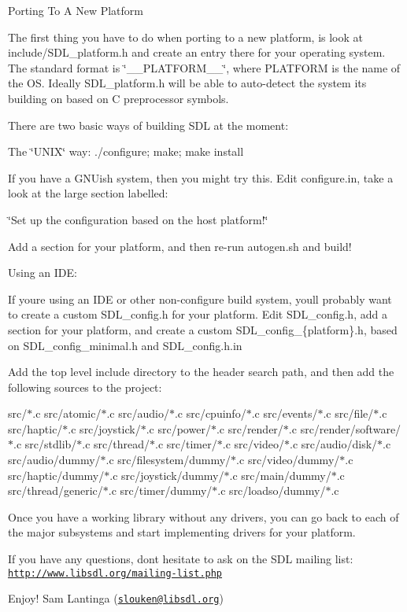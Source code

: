 
\begin{DoxyItemize}
\item Porting To A New Platform

The first thing you have to do when porting to a new platform, is look at include/\+S\+D\+L\+\_\+platform.\+h and create an entry there for your operating system. The standard format is \char`\"{}\+\_\+\+\_\+\+P\+L\+A\+T\+F\+O\+R\+M\+\_\+\+\_\+\char`\"{}, where P\+L\+A\+T\+F\+O\+RM is the name of the OS. Ideally S\+D\+L\+\_\+platform.\+h will be able to auto-\/detect the system it\textquotesingle{}s building on based on C preprocessor symbols.
\end{DoxyItemize}

There are two basic ways of building S\+DL at the moment\+:


\begin{DoxyEnumerate}
\item The \char`\"{}\+U\+N\+I\+X\char`\"{} way\+: ./configure; make; make install

If you have a G\+N\+Uish system, then you might try this. Edit configure.\+in, take a look at the large section labelled\+:

\char`\"{}\+Set up the configuration based on the host platform!\char`\"{}

Add a section for your platform, and then re-\/run autogen.\+sh and build!
\item Using an I\+DE\+:

If you\textquotesingle{}re using an I\+DE or other non-\/configure build system, you\textquotesingle{}ll probably want to create a custom S\+D\+L\+\_\+config.\+h for your platform. Edit S\+D\+L\+\_\+config.\+h, add a section for your platform, and create a custom S\+D\+L\+\_\+config\+\_\+\{platform\}.h, based on S\+D\+L\+\_\+config\+\_\+minimal.\+h and S\+D\+L\+\_\+config.\+h.\+in

Add the top level include directory to the header search path, and then add the following sources to the project\+:

src/$\ast$.c src/atomic/$\ast$.c src/audio/$\ast$.c src/cpuinfo/$\ast$.c src/events/$\ast$.c src/file/$\ast$.c src/haptic/$\ast$.c src/joystick/$\ast$.c src/power/$\ast$.c src/render/$\ast$.c src/render/software/$\ast$.c src/stdlib/$\ast$.c src/thread/$\ast$.c src/timer/$\ast$.c src/video/$\ast$.c src/audio/disk/$\ast$.c src/audio/dummy/$\ast$.c src/filesystem/dummy/$\ast$.c src/video/dummy/$\ast$.c src/haptic/dummy/$\ast$.c src/joystick/dummy/$\ast$.c src/main/dummy/$\ast$.c src/thread/generic/$\ast$.c src/timer/dummy/$\ast$.c src/loadso/dummy/$\ast$.c
\end{DoxyEnumerate}

Once you have a working library without any drivers, you can go back to each of the major subsystems and start implementing drivers for your platform.

If you have any questions, don\textquotesingle{}t hesitate to ask on the S\+DL mailing list\+: \href{http://www.libsdl.org/mailing-list.php}{\tt http\+://www.\+libsdl.\+org/mailing-\/list.\+php}

Enjoy! Sam Lantinga (\href{mailto:slouken@libsdl.org}{\tt slouken@libsdl.\+org}) 